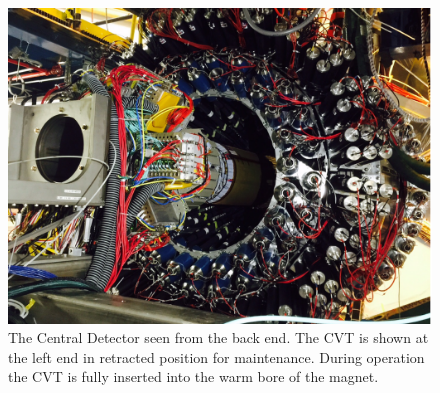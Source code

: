 \documentclass[final,3p,times,twocolumn,authoryear]{elsarticle}
\begin{document}
\begin{figure}[htbp!]
\centerline{\includegraphics[width=1.0\columnwidth]{CLAS12-CD.png}}
\caption{The Central Detector seen from the back end. The CVT is shown at the left end in 
retracted position for maintenance.
During operation the CVT is  fully inserted into the warm bore of the magnet.  }
\label{CDback}
\end{figure}


\end{document}

